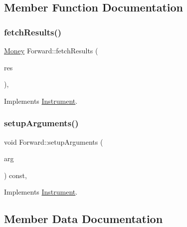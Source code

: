 \subsection{Member Function Documentation}
\hypertarget{class_forward_ab1e2edeb8345c8605013634a598d1ae5}{}\label{class_forward_ab1e2edeb8345c8605013634a598d1ae5} 
\subsubsection{\texorpdfstring{fetch\+Results()}{fetchResults()}}
{\footnotesize\ttfamily \hyperlink{_name_def_8h_a5a9d48c16a694e9a2d9f1eca730dc8c5}{Money} Forward\+::fetch\+Results (\begin{DoxyParamCaption}\item[{\hyperlink{class_pricing_engine_1_1_results}{Pricing\+Engine\+::\+Results} $\ast$const}]{res }\end{DoxyParamCaption})\hspace{0.3cm}{\ttfamily [override]}, {\ttfamily [virtual]}}



Implements \hyperlink{class_instrument_a381f093402f789ad7c0ffecd233167dc}{Instrument}.

\hypertarget{class_forward_ad6208ba4ee03c396e611c142be735b26}{}\label{class_forward_ad6208ba4ee03c396e611c142be735b26} 
\subsubsection{\texorpdfstring{setup\+Arguments()}{setupArguments()}}
{\footnotesize\ttfamily void Forward\+::setup\+Arguments (\begin{DoxyParamCaption}\item[{\hyperlink{class_pricing_engine_1_1_arguments}{Pricing\+Engine\+::\+Arguments} $\ast$}]{arg }\end{DoxyParamCaption}) const\hspace{0.3cm}{\ttfamily [override]}, {\ttfamily [virtual]}}



Implements \hyperlink{class_instrument_ac0f78fd32a360abde0c31b5bc01c7e67}{Instrument}.



\subsection{Member Data Documentation}
\hypertarget{class_forward_ad599104a13c33fbf31e9214af904e9aa}{}\label{class_forward_ad599104a13c33fbf31e9214af904e9aa} 
